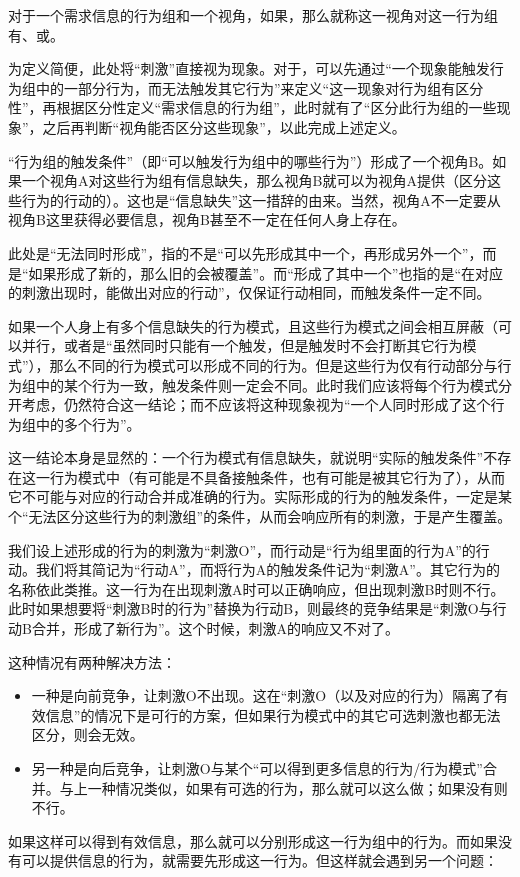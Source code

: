对于一个需求信息的行为组和一个视角，如果，那么就称这一视角对这一行为组有、或。
\begin{explain}
为定义简便，此处将“刺激”直接视为现象。对于\rigorous，可以先通过“一个现象能触发行为组中的一部分行为，而无法触发其它行为”来定义“这一现象对行为组有区分性”，再根据区分性定义“需求信息的行为组”，此时就有了“区分此行为组的一些现象”，之后再判断“视角能否区分这些现象”，以此完成上述定义。

“行为组的触发条件”（即“可以触发行为组中的哪些行为”）形成了一个视角B。如果一个视角A对这些行为组有信息缺失，那么视角B就可以为视角A提供（区分这些行为的行动的）。这也是“信息缺失”这一措辞的由来。当然，视角A不一定要从视角B这里获得必要信息，视角B甚至不一定在任何人身上存在。
\end{explain}
\begin{explain}
此处是“无法同时形成”，指的不是“可以先形成其中一个，再形成另外一个”，而是“如果形成了新的，那么旧的会被覆盖”。而“形成了其中一个”也指的是“在对应的刺激出现时，能做出对应的行动”，仅保证行动相同，而触发条件一定不同。

如果一个人身上有多个信息缺失的行为模式，且这些行为模式之间会相互屏蔽（可以并行，或者是“虽然同时只能有一个触发，但是触发时不会打断其它行为模式”），那么不同的行为模式可以形成不同的行为。但是这些行为仅有行动部分与行为组中的某个行为一致，触发条件则一定会不同。此时我们应该将每个行为模式分开考虑，仍然符合这一结论；而不应该将这种现象视为“一个人同时形成了这个行为组中的多个行为”。

这一结论本身是显然的：一个行为模式有信息缺失，就说明“实际的触发条件”不存在这一行为模式中（有可能是不具备接触条件，也有可能是被其它行为了），从而它不可能与对应的行动合并成准确的行为。实际形成的行为的触发条件，一定是某个“无法区分这些行为的刺激组”的条件，从而会响应所有的刺激，于是产生覆盖。

我们设上述形成的行为的刺激为“刺激O”，而行动是“行为组里面的行为A”的行动。我们将其简记为“行动A”，而将行为A的触发条件记为“刺激A”。其它行为的名称依此类推。这一行为在出现刺激A时可以正确响应，但出现刺激B时则不行。此时如果想要将“刺激B时的行为”替换为行动B，则最终的竞争结果是“刺激O与行动B合并，形成了新行为”。这个时候，刺激A的响应又不对了。

这种情况有两种解决方法：\vspace{-0.25em}
\begin{itemize}
\item 一种是向前竞争，让刺激O不出现。这在“刺激O（以及对应的行为）隔离了有效信息”的情况下是可行的方案，但如果行为模式中的其它可选刺激也都无法区分，则会无效。\vspace{-0.5em}

\item 另一种是向后竞争，让刺激O与某个“可以得到更多信息的行为/行为模式”合并。与上一种情况类似，如果有可选的行为，那么就可以这么做；如果没有则不行。\vspace{-0.25em}
\end{itemize}
如果这样可以得到有效信息，那么就可以分别形成这一行为组中的行为。而如果没有可以提供信息的行为，就需要先形成这一行为。但这样就会遇到另一个问题：
\end{explain}
